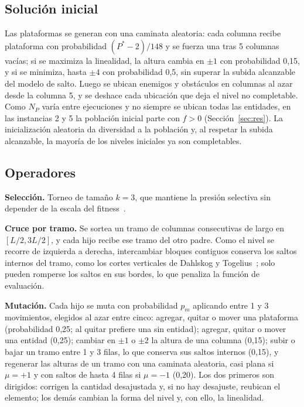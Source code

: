 \documentclass[letter, 10pt]{article}
\begin{document}
\subsection{Soluci\'on inicial}
Las plataformas se generan con una caminata aleatoria: cada columna recibe plataforma con probabilidad $(P^*-2)/148$ y se fuerza una tras 5 columnas vac\'ias; si se maximiza la linealidad, la altura cambia en $\pm1$ con probabilidad 0,15, y si se minimiza, hasta $\pm4$ con probabilidad 0,5, sin superar la subida alcanzable del modelo de salto. Luego se ubican enemigos y obst\'aculos en columnas al azar desde la columna 5, y se deshace cada ubicaci\'on que deja el nivel no completable. Como $N_P$ var\'ia entre ejecuciones y no siempre se ubican todas las entidades, en las instancias 2 y 5 la poblaci\'on inicial parte con $f>0$ (Secci\'on~\ref{sec:res}). La inicializaci\'on aleatoria da diversidad a la poblaci\'on y, al respetar la subida alcanzable, la mayor\'ia de los niveles iniciales ya son completables.

\subsection{Operadores}
\textbf{Selecci\'on.} Torneo de tama\~no $k=3$, que mantiene la presi\'on selectiva sin depender de la escala del fitness~\cite{Eiben2015}.

\textbf{Cruce por tramo.} Se sortea un tramo de columnas consecutivas de largo en $[L/2, 3L/2]$, y cada hijo recibe ese tramo del otro padre. Como el nivel se recorre de izquierda a derecha, intercambiar bloques contiguos conserva los saltos internos del tramo, como los cortes verticales de Dahlskog y Togelius~\cite{Dahlskog2013}; solo pueden romperse los saltos en sus bordes, lo que penaliza la funci\'on de evaluaci\'on.

\textbf{Mutaci\'on.} Cada hijo se muta con probabilidad $p_m$ aplicando entre 1 y 3 movimientos, elegidos al azar entre cinco: agregar, quitar o mover una plataforma (probabilidad 0,25; al quitar prefiere una sin entidad); agregar, quitar o mover una entidad (0,25); cambiar en $\pm1$ o $\pm2$ la altura de una columna (0,15); subir o bajar un tramo entre 1 y 3 filas, lo que conserva sus saltos internos (0,15), y regenerar las alturas de un tramo con una caminata aleatoria, casi plana si $\mu=+1$ y con saltos de hasta 4 filas si $\mu=-1$ (0,20). Los dos primeros son dirigidos: corrigen la cantidad desajustada y, si no hay desajuste, reubican el elemento; los dem\'as cambian la forma del nivel y, con ello, la linealidad.
\end{document}

